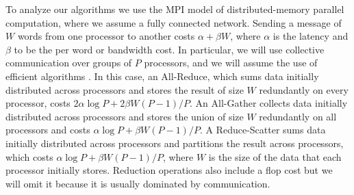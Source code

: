 To analyze our algorithms we use the MPI model of distributed-memory parallel computation, where we assume a fully connected network. 
Sending a message of $W$ words from one processor to another costs $\alpha + \beta W$, where $\alpha$ is the latency and $\beta$ to be the per word or bandwidth cost. 
In particular, we will use collective communication over groups of $P$ processors, and we will assume the use of efficient algorithms \cite{TRG05,CH+07}.
In this case, an All-Reduce, which sums data initially distributed across processors and stores the result of size $W$ redundantly on every processor, costs $2\alpha \log P + 2\beta W (P-1)/P$.
An All-Gather collects data initially distributed across processors and stores the union of size $W$ redundantly on all processors and costs $\alpha \log P + \beta W (P-1)/P$.
A Reduce-Scatter sums data initially distributed across processors and partitions the result across processors, which costs $\alpha \log P + \beta W (P-1)/P$, where $W$ is the size of the data that each processor initially stores.
Reduction operations also include a flop cost but we will omit it because it is usually dominated by communication. 

